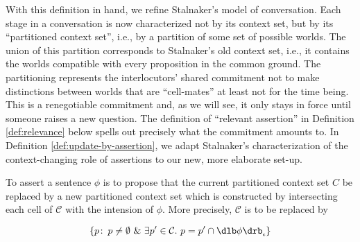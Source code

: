 %
%
%
With this definition in hand, we refine Stalnaker's model of conversation. Each
stage in a conversation is now characterized not by its context set, but by its
``partitioned context set'', i.e., by a partition of some set of possible
worlds. The union of this partition corresponds to Stalnaker's old context set,
i.e., it contains the worlds compatible with every proposition in the common
ground. The partitioning represents the interlocutors' shared commitment not to
make distinctions between worlds that are ``cell-mates'' \dash at least not for
the time being. This is a renegotiable commitment and, as we will see, it only
stays in force until someone raises a new question. The definition of ``relevant
assertion'' in Definition \ref{def:relevance} below spells out precisely what
the commitment amounts to. In Definition \ref{def:update-by-assertion}, we adapt
Stalnaker's characterization of the context-changing role of assertions to our
new, more elaborate set-up.

\begin{definition}\label{def:update-by-assertion}
  To assert a sentence $\phi$ is to propose that the current partitioned context
  set $C$ be replaced by a new partitioned context set which is constructed by
  intersecting each cell of $\mathcal{C}$ with the intension of $\phi$. More
  precisely, $\mathcal{C}$ is to be replaced by

  $$\{p\co p\neq\emptyset\ \&\ \exists p'\in \mathcal{C}.\ p = p' \cap \svcent{\phi}\}$$
\end{definition}

